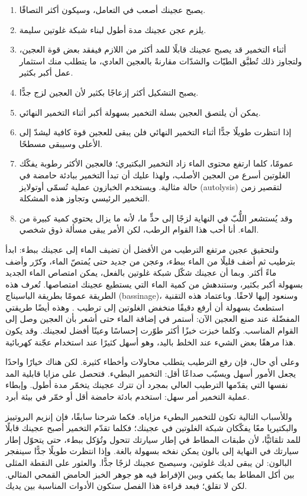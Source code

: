 \begin{enumerate}
  \item يصبح عجينك أصعب في التعامل، وسيكون أكثر التصاقًا.
  \item يلزم عجن عجينك مدة أطول لبناء شبكة غلوتين سليمة.
  \item أثناء التخمير قد يصبح عجينك قابلًا للمد أكثر من اللازم فيفقد بعض قوة العجين، ولتجاوز ذلك تُطبَّق الطيّات والشدّات مقارنةً بالعجين العادي، ما يتطلب منك استثمار عمل أكبر بكثير.
  \item يصبح التشكيل أكثر إزعاجًا بكثير لأن العجين لزج جدًّا.
  \item يمكن أن يلتصق العجين بسلة التخمير بسهولة أكبر أثناء التخمير النهائي.
  \item إذا انتظرت طويلًا جدًّا أثناء التخمير النهائي فلن يبقى للعجين قوة كافية ليشدّ إلى الأعلى وسيبقى مسطحًا.
  \item عمومًا، كلما ارتفع محتوى الماء زاد التخمير البكتيري؛ فالعجين الأكثر رطوبة يفكّك الغلوتين أسرع من العجين الأصلب، ولهذا عليك أن تبدأ التخمير ببادئة حامضة في حالة مثالية. ويستخدم الخبازون عملية تُسمّى أوتولايز (autolysis) لتقصير زمن التخمير الرئيسي وتجاوز هذه المشكلة.
  \item وقد يُستشعر اللُّبّ في النهاية لزجًا إلى حدٍّ ما، لأنه ما يزال يحتوي كمية كبيرة من الماء. أنا أحب هذا القوام الرطب، لكن الأمر يبقى مسألة ذوق شخصي.
\end{enumerate}

ولتحقيق عجين مرتفع الترطيب من الأفضل أن تضيف الماء إلى عجينك ببطء: ابدأ بترطيب  ثم أضف قليلًا من الماء ببطء، وعجن من جديد حتى يُمتصّ الماء، وكرّر وأضف ماءً أكثر. وبما أن عجينك شكّل شبكة غلوتين بالفعل، يمكن امتصاص الماء الجديد بسهولة أكبر بكثير، وستندهش من كمية الماء التي يستطيع عجينك امتصاصها. تُعرف هذه الطريقة عمومًا بطريقة الباسيناج (bassinage)، وسنعود إليها لاحقًا. وباعتماد هذه التقنية استطعتُ بسهولة أن أرفع دقيقًا منخفض الغلوتين إلى ترطيب . وهذه أيضًا طريقتي المفضّلة عند صنع العجين الآن: أستمر في إضافة الماء حتى أشعر بأن العجين وصل إلى القوام المناسب. وكلما خبزت خبزًا أكثر طوّرت إحساسًا وعينًا أفضل لعجينك. وقد يكون هذا مرهقًا بعض الشيء عند الخلط باليد، وهو أسهل كثيرًا عند استخدام عجّنة كهربائية.

وعلى أي حال، فإن رفع الترطيب يتطلب محاولات وأخطاء كثيرة. لكن هناك خيارًا واحدًا يجعل الأمور أسهل ويسبّب صداعًا أقل: التخمير البطيء. فتحصل على مزايا قابلية المد نفسها التي يقدّمها الترطيب العالي بمجرد أن تترك عجينك يتخمّر مدة أطول. وإبطاء عملية التخمير أمر سهل: استخدم بادئة حامضة أقل أو خمّر في بيئة أبرد.

وللأسباب التالية تكون للتخمير البطيء مزاياه. فكما شرحنا سابقًا، فإن إنزيم البروتييز والبكتيريا معًا يفكّكان شبكة الغلوتين في عجينك؛ فكلما تقدّم التخمير أصبح عجينك قابلًا للمد تلقائيًّا، لأن طبقات المطاط في إطار سيارتك تتحول وتُؤكل ببطء، حتى يتحوّل إطار سيارتك في النهاية إلى بالون يمكن نفخه بسهولة بالغة. وإذا انتظرت طويلًا جدًّا سينفجر البالون: لن يبقى لديك غلوتين، وسيصبح عجينك لزجًا جدًّا. والعثور على النقطة المثلى بين أكل المطاط بما يكفي وبين الإفراط فيه هو جوهر الخبز الحامض القمحي المثالي. لكن لا تقلق؛ فبعد قراءة هذا الفصل ستكون الأدوات المناسبة بين يديك.

